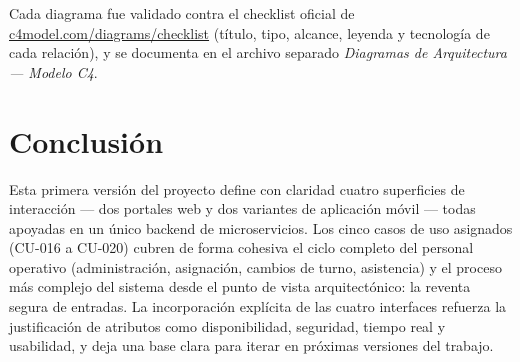 \documentclass[12pt,a4paper]{article}
\begin{document}
Cada diagrama fue validado contra el checklist oficial de
\href{https://c4model.com/diagrams/checklist}{c4model.com/diagrams/checklist} (título, tipo,
alcance, leyenda y tecnología de cada relación), y se documenta en el archivo separado
\textit{Diagramas de Arquitectura --- Modelo C4}.

\section{Conclusión}

Esta primera versión del proyecto define con claridad cuatro superficies de interacción --- dos
portales web y dos variantes de aplicación móvil --- todas apoyadas en un único backend de
microservicios. Los cinco casos de uso asignados (CU-016 a CU-020) cubren de forma cohesiva el
ciclo completo del personal operativo (administración, asignación, cambios de turno, asistencia)
y el proceso más complejo del sistema desde el punto de vista arquitectónico: la reventa segura
de entradas. La incorporación explícita de las cuatro interfaces refuerza la justificación de
atributos como disponibilidad, seguridad, tiempo real y usabilidad, y deja una base clara para
iterar en próximas versiones del trabajo.
\end{document}
